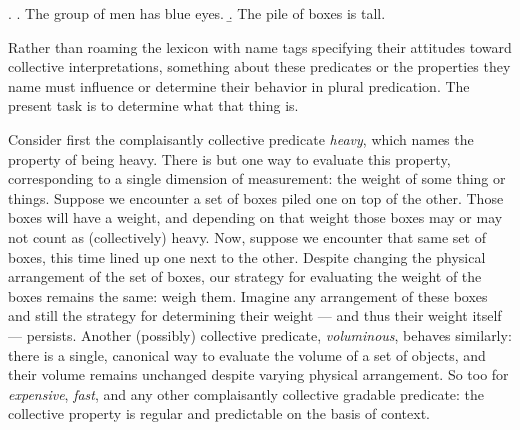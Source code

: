 \documentclass[linguex]{sp}
\begin{document}
\ex. \a. The group of men has blue eyes. 
\b. The pile of boxes is tall.

Rather than roaming the lexicon with name tags specifying their attitudes toward collective interpretations, something about these predicates or the properties they name must influence or determine their behavior in plural predication. The present task is to determine what that thing is.


Consider first the complaisantly collective predicate \emph{heavy}, which names the property of being heavy. There is but one way to evaluate this property, corresponding to a single dimension of measurement: the weight of some thing or things. Suppose we encounter a set of boxes piled one on top of the other. Those boxes will have a weight, and depending on that weight those boxes may or may not count as (collectively) heavy. Now, suppose we encounter that same set of boxes, this time lined up one next to the other. Despite changing the physical arrangement of the set of boxes, our strategy for evaluating the weight of the boxes remains the same: weigh them. Imagine any arrangement of these boxes and still the strategy for determining their weight --- and thus their weight itself --- persists. Another (possibly) collective predicate, \emph{voluminous}, behaves similarly: there is a single, canonical way to evaluate the volume of a set of objects, and their volume remains unchanged despite varying physical arrangement. So too for \emph{expensive}, \emph{fast}, and any other  complaisantly collective gradable predicate: the collective property is regular and predictable on the basis of context.
\end{document}
